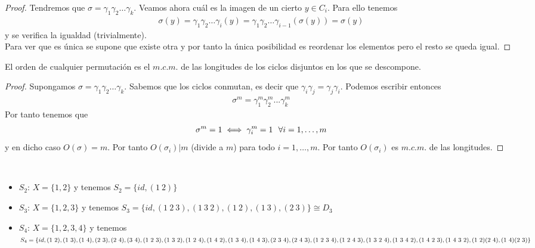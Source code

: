 \begin{teo}
\begin{proof}
        Tendremos que $\sigma = \gamma_1\gamma_2\dots \gamma_k$. Veamos ahora cuál es la imagen de un cierto $y\in C_i$. Para ello tenemos
        \begin{gather*}
            \sigma(y)=\gamma_1\gamma_2\dots\gamma_i(y) = \gamma_1\gamma_2\dots\gamma_{i-1}(\sigma(y)) = \sigma(y)
        \end{gather*}
        y se verifica la igualdad (trivialmente).\\

        Para ver que es única se supone que existe otra y por tanto la única posibilidad es reordenar los elementos pero el resto se queda igual.
    \end{proof}
 \end{teo}

 \begin{coro}
    El orden de cualquier permutación es el $m.c.m.$ de las longitudes de los ciclos disjuntos en los que se descompone.
    \begin{proof}
        Supongamos $\sigma = \gamma_1\gamma_2\dots\gamma_k$. Sabemos que los ciclos conmutan, es decir que $\gamma_i\gamma_j=\gamma_j\gamma_i$. Podemos escribir entonces 
        \begin{gather*}
            \sigma^m = \gamma_1^m\gamma_2^m...\gamma_k^m
        \end{gather*}
        Por tanto tenemos que
        \begin{gather*}
            \sigma^m = 1 \iff \gamma_i^m = 1\ \ \forall i=1,\dots,m
        \end{gather*}
        y en dicho caso $O(\sigma)=m$. Por tanto $O(\sigma_i)|m$ (divide a $m$) para todo $i=1,\dots,m$. Por tanto $O(\sigma_i)$ es $m.c.m.$ de las longitudes.
    \end{proof}
 \end{coro}

 \begin{ejemplo}\
    \begin{itemize}
        \item $S_2$: $X=\{1,2\}$ y tenemos $S_2 = \{id, (1\ 2)\}$
        \item $S_3$: $X=\{1,2,3\}$ y tenemos $S_3 = \{id, (1\ 2\ 3), (1\ 3\ 2), (1\ 2), (1\ 3),(2\ 3)\} \cong D_3$ 
        \item $S_4$: $X=\{1,2,3,4\}$ y tenemos $S_4 = \{id, (1\ 2), (1\ 3), (1\ 4), (2\ 3), (2\ 4), (3\ 4),\\ (1\ 2\ 3), (1\ 3\ 2), (1\ 2\ 4), (1\ 4\ 2), (1\ 3\ 4), (1\ 4\ 3), (2\ 3\ 4), (2\ 4\ 3), (1\ 2\ 3\ 4), (1\ 2\ 4\ 3),\\ (1\ 3\ 2\ 4), (1\ 3\ 4\ 2), (1\ 4\ 2\ 3), (1\ 4\ 3\ 2), (1\ 2)(2\ 4), (1\ 4)(2\ 3) \}$ 
    \end{itemize}
 \end{ejemplo}

 
